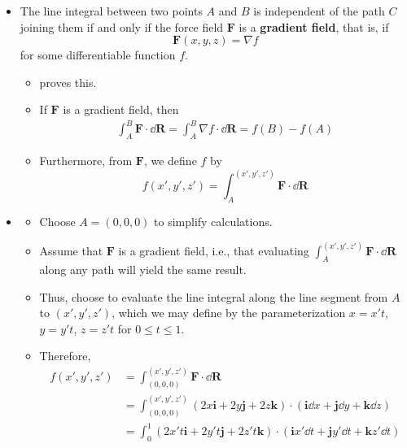 \documentclass[../main.tex]{subfiles}
\begin{document}
\begin{itemize}
\begin{itemize}
    \end{itemize}
    \item The line integral between two points $A$ and $B$ is independent of the path $C$ joining them if and only if the force field $\mathbf{F}$ is a \textbf{gradient field}, that is, if
    \begin{equation*}
        \mathbf{F}(x,y,z) = \nabla f
    \end{equation*}
    for some differentiable function $f$.
    \begin{itemize}
        \item \textcite{bib:Thomas} proves this.
        \item If $\mathbf{F}$ is a gradient field, then
        \begin{align*}
            \int_A^B\mathbf{F}\cdot\dd{\mathbf{R}} = \int_A^B\nabla f\cdot\dd{\mathbf{R}} = f(B)-f(A)
        \end{align*}
        \item Furthermore, from $\mathbf{F}$, we define $f$ by
        \begin{equation*}
            f(x',y',z') = \int_A^{(x',y',z')}\mathbf{F}\cdot\dd{\mathbf{R}}
        \end{equation*}
    \end{itemize}
    \item {}
    \begin{itemize}
        \item Choose $A=(0,0,0)$ to simplify calculations.
        \item Assume that $\mathbf{F}$ is a gradient field, i.e., that evaluating $\int_A^{(x',y',z')}\mathbf{F}\cdot\dd{\mathbf{R}}$ along any path will yield the same result.
        \item Thus, choose to evaluate the line integral along the line segment from $A$ to $(x',y',z')$, which we may define by the parameterization $x=x't$, $y=y't$, $z=z't$ for $0\leq t\leq 1$.
        \item Therefore,
        \begingroup
        \allowdisplaybreaks
        \begin{align*}
            f(x',y',z') &= \int_{(0,0,0)}^{(x',y',z')}\mathbf{F}\cdot\dd{\mathbf{R}}\\
            &= \int_{(0,0,0)}^{(x',y',z')}(2x\mathbf{i}+2y\mathbf{j}+2z\mathbf{k})\cdot(\mathbf{i}\dd{x}+\mathbf{j}\dd{y}+\mathbf{k}\dd{z})\\
            &= \int_0^1(2x't\mathbf{i}+2y't\mathbf{j}+2z't\mathbf{k})\cdot(\mathbf{i}x'\dd{t}+\mathbf{j}y'\dd{t}+\mathbf{k}z'\dd{t})\\

\end{align*}
\end{itemize}
\end{itemize}
\end{document}
